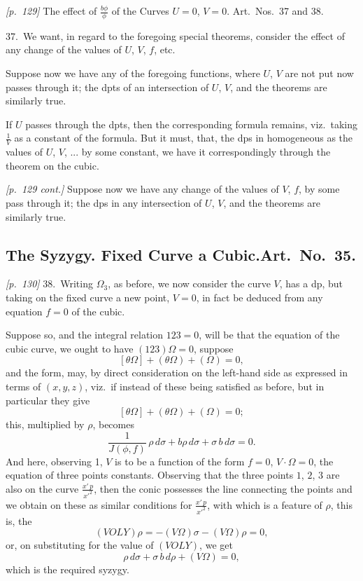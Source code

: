 \documentclass[11pt,a4paper]{article}
\theoremstyle{plain}
\theoremstyle{definition}
\theoremstyle{remark}
\begin{document}
\bigskip\noindent\textit{[p.~129]} The effect of $\frac{b\phi}{\phi}$ of the Curves $U = 0$, $V = 0$. Art.\ Nos.~37 and 38.

37.\ We want, in regard to the foregoing special theorems, consider the effect of any change of the values of $U$, $V$, $f$, etc.

Suppose now we have any of the foregoing functions, where $U$, $V$ are not put now passes through it; the dpts of an intersection of $U$, $V$, and the theorems are similarly true.

If $U$ passes through the dpts, then the corresponding formula remains, viz.\ taking $\frac{1}{V}$ as a constant of the formula. But it must, that, the dps in homogeneous as the values of $U$, $V$, ... by some constant, we have it correspondingly through the theorem on the cubic.

\textit{[p.~129 cont.]} Suppose now we have any change of the values of $V$, $f$, by some pass through it; the dps in any intersection of $U$, $V$, and the theorems are similarly true.

\subsection*{The Syzygy. Fixed Curve a Cubic.\quad Art.\ No.\ 35.}

\noindent\textit{[p.~130]} 38.\ Writing $\Omega_3$, as before, we now consider the curve $V$, has a dp, but taking on the fixed curve a new point, $V = 0$, in fact be deduced from any equation $f = 0$ of the cubic.

Suppose so, and the integral relation $123 = 0$, will be that the equation of the cubic curve, we ought to have $(123)\Omega = 0$, suppose
\[
[\theta\Omega] + (\theta\Omega) + (\Omega) = 0,
\]
and the form, may, by direct consideration on the left-hand side as expressed in terms of $(x, y, z)$, viz.\ if instead of these being satisfied as before, but in particular they give
\[
[\theta\Omega] + (\theta\Omega) + (\Omega) = 0;
\]
this, multiplied by $\rho$, becomes
\[
\frac{1}{J(\phi, f)}\,\rho\,d\sigma + b\rho\,d\sigma + \sigma\,b\,d\sigma = 0.
\]
And here, observing 1, $V$ is to be a function of the form $f = 0$, $V \cdot \Omega = 0$, the equation of three points constants. Observing that the three points $1$, $2$, $3$ are also on the curve $\frac{x'\,p}{x'^2}$, then the conic possesses the line connecting the points and we obtain on these as similar conditions for $\frac{x'\,p}{x'^2}$, with which is a feature of $\rho$, this is, the
\[
(VOLY)\rho = -(V\Omega)\sigma - (V\Omega)\rho = 0,
\]
or, on substituting for the value of $(VOLY)$, we get
\[
\rho\,d\sigma + \sigma\,b\,d\rho + (V\Omega) = 0,
\]
which is the required syzygy.
\end{document}
